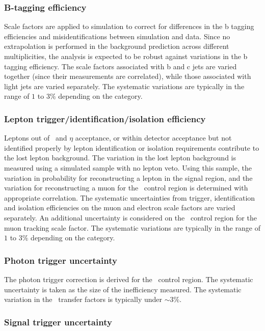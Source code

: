 \subsubsection{B-tagging efficiency}

Scale factors are applied to simulation to correct for differences in the 
b tagging efficiencies and misidentifications between simulation and data. 
Since no extrapolation is performed in the background prediction across different 
\nb multiplicities, the analysis is expected to be robust against variations in the 
b tagging efficiency. The scale factors associated with b and c jets are varied together 
(since their measurements are correlated), while those associated with light jets are varied separately.
The systematic variations are typically in the range of $1$ to $3\%$ depending on the category.

\subsubsection{Lepton trigger/identification/isolation efficiency}
\label{sec:tfSyst_lepton}

Leptons out of \pt~and $\eta$ acceptance, or within detector
acceptance but not identified properly by lepton identification or isolation
requirements contribute to the lost lepton background. The variation 
in the lost lepton background is measured using a simulated sample with no lepton veto.
Using this sample, the variation in probability for reconstructing a lepton in the signal region,
and the variation for reconstructing a muon for the \mj~control region is determined with 
appropriate correlation. The systematic uncertainties from trigger, identification and 
isolation efficiencies on the muon and electron scale factors are varied separately. 
An additional uncertainty is considered on the \mj~control region for the muon tracking
scale factor. The systematic variations are typically in the range of $1$ to $3\%$ depending on the category.

\subsubsection{Photon trigger uncertainty}
\label{sec:tfSyst_pho}
The photon trigger correction is derived for the \gj~control region. The systematic uncertainty is
taken as the size of the inefficiency measured. The systematic variation in the \gj~transfer factors 
is typically under $\sim3\%$.

\subsubsection{Signal trigger uncertainty}
\label{sec:tfSyst_trigger}

